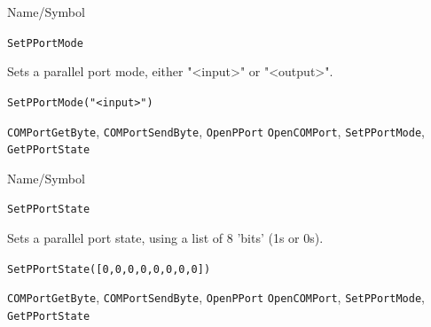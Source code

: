 \begin{desc}{Name/Symbol}
\item[Name/Symbol] \verb+SetPPortMode+ 

\item[Description]  
  Sets a parallel port mode, either "<input>" or "<output>".
  
\item[Usage]       
     \verb+SetPPortMode("<input>")+ 
\item[Example]

\item[See Also]
\verb+COMPortGetByte+, \verb+COMPortSendByte+, \verb+OpenPPort+ \verb+OpenCOMPort+, \verb+SetPPortMode+, \verb+GetPPortState+ 
\end{desc} 

\begin{desc}{Name/Symbol}
\item[Name/Symbol] \verb+SetPPortState+ 

\item[Description]  
  Sets a parallel port state, using a list of 8 'bits' (1s or 0s).
  
\item[Usage]       
     \verb+SetPPortState([0,0,0,0,0,0,0,0])+ 
\item[Example]


\item[See Also]
\verb+COMPortGetByte+, \verb+COMPortSendByte+, \verb+OpenPPort+ \verb+OpenCOMPort+, \verb+SetPPortMode+, \verb+GetPPortState+ 
\end{desc} 


